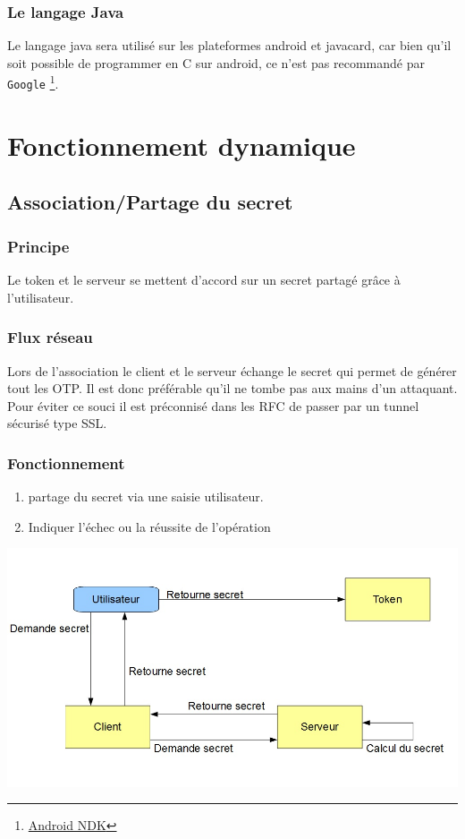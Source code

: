 \documentclass{"../../res/univ-projet"}
\begin{document}
\subsubsection{Le langage Java}
    Le langage java sera utilis\'e sur les plateformes android
    et javacard, car bien qu'il soit possible de programmer en C
    sur android, ce n'est pas recommand\'e par \verb?Google?
    \footnote{\href{https://developer.android.com/tools/sdk/ndk/index.html}{Android NDK}}.
        
\section{Fonctionnement dynamique}
\subsection{Association/Partage du secret}
\subsubsection{Principe}
Le token et le serveur se mettent d'accord sur un secret partag\'e gr\^ace à l'utilisateur.

\subsubsection{Flux réseau}
Lors de l'association le client et le serveur échange le secret qui permet
de générer tout les OTP. Il est donc préférable qu'il ne tombe pas aux mains
d'un attaquant. Pour éviter ce souci il est préconnisé dans les RFC de passer
par un tunnel sécurisé type SSL.

\subsubsection{Fonctionnement}
\begin{enumerate}
    \item partage du secret via une saisie utilisateur.
    \item Indiquer l'échec ou la réussite de l'opération
\end{enumerate}
\includegraphics[width=\textwidth]{../graphics/association.jpg}
\end{document}
